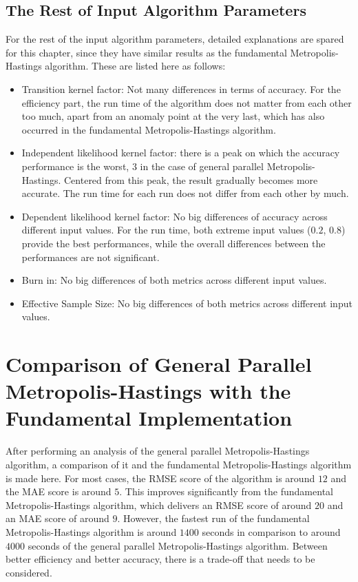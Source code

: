 \subsection{The Rest of Input Algorithm Parameters}
For the rest of the input algorithm parameters, detailed explanations are spared for this chapter, since they have similar results as the fundamental Metropolis-Hastings algorithm. These are listed here as follows: 
\begin{itemize}
    \item Transition kernel factor: Not many differences in terms of accuracy. For the efficiency part, the run time of the algorithm does not matter from each other too much, apart from an anomaly point at the very last, which has also occurred in the fundamental Metropolis-Hastings algorithm.
    \item Independent likelihood kernel factor: there is a peak on which the accuracy performance is the worst, $3$ in the case of general parallel Metropolis-Hastings. Centered from this peak, the result gradually becomes more accurate. The run time for each run does not differ from each other by much.
    \item Dependent likelihood kernel factor: No big differences of accuracy across different input values. For the run time, both extreme input values ($0.2$, $0.8$) provide the best performances, while the overall differences between the performances are not significant.
    \item Burn in: No big differences of both metrics across different input values.
    \item Effective Sample Size: No big differences of both metrics across different input values.
\end{itemize}

\section{Comparison of General Parallel Metropolis-Hastings with the Fundamental Implementation}
After performing an analysis of the general parallel Metropolis-Hastings algorithm, a comparison of it and the fundamental Metropolis-Hastings algorithm is made here. For most cases, the RMSE score of the algorithm is around $12$ and the MAE score is around $5$. This improves significantly from the fundamental Metropolis-Hastings algorithm, which delivers an RMSE score of around $20$ and an MAE score of around $9$. However, the fastest run of the fundamental Metropolis-Hastings algorithm is around $1400$ seconds in comparison to around $4000$ seconds of the general parallel Metropolis-Hastings algorithm. Between better efficiency and better accuracy, there is a trade-off that needs to be considered.